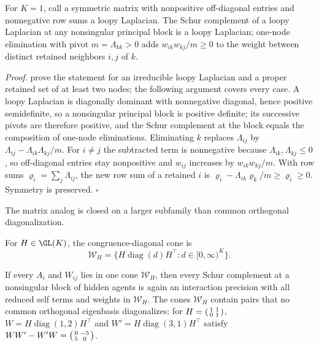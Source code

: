 For \(K=1\), call a symmetric matrix with nonpositive off-diagonal entries and
nonnegative row sums a loopy Laplacian. The Schur complement of a loopy
Laplacian at any nonsingular principal block is a loopy Laplacian; one-node
elimination with pivot \(m=\Lambda_{kk}>0\) adds \(w_{ik}w_{kj}/m\geq0\) to the
weight between distinct retained neighbors \(i,j\) of \(k\).

\noindent\emph{Proof.}
\citet[Lemma~II.1]{DorflerBullo2013Kron} prove the statement for an irreducible
loopy Laplacian and a proper retained set of at least two nodes; the following
argument covers every case. A loopy Laplacian is diagonally dominant with
nonnegative diagonal, hence positive semidefinite, so a nonsingular principal
block is positive definite; its successive pivots are therefore positive, and
the Schur complement at the block equals the composition of one-node
eliminations. Eliminating \(k\) replaces \(\Lambda_{ij}\) by
\(\Lambda_{ij}-\Lambda_{ik}\Lambda_{kj}/m\). For \(i\neq j\) the subtracted term
is nonnegative because \(\Lambda_{ik},\Lambda_{kj}\leq0\), so off-diagonal
entries stay nonpositive and \(w_{ij}\) increases by \(w_{ik}w_{kj}/m\). With
row sums \(\varrho_i=\sum_j\Lambda_{ij}\), the new row sum of a retained \(i\) is
\(\varrho_i-\Lambda_{ik}\varrho_k/m\geq\varrho_i\geq0\). Symmetry is preserved.
\(\square\)

The matrix analog is closed on a larger subfamily than common orthogonal
diagonalization.

For \(H\in\GL(K)\), the congruence-diagonal cone is
\begin{equation}
\mathcal W_H
=\{H\operatorname{diag}(d)H^\top:d\in[0,\infty)^K\}.
\label{eq:cg-congruence-diagonal-cone}
\end{equation}

If every \(A_i\) and \(W_{ij}\) lies in one cone \(\mathcal W_H\), then every
Schur complement at a nonsingular block of hidden agents is again an interaction
precision with all reduced self terms and weights in \(\mathcal W_H\). The cones
\(\mathcal W_H\) contain pairs that no common orthogonal eigenbasis
diagonalizes: for \(H=\begin{psmallmatrix}1&1\\0&1\end{psmallmatrix}\),
\(W=H\operatorname{diag}(1,2)H^\top\) and \(W'=H\operatorname{diag}(3,1)H^\top\)
satisfy \(WW'-W'W=\begin{psmallmatrix}0&-5\\5&0\end{psmallmatrix}\).

